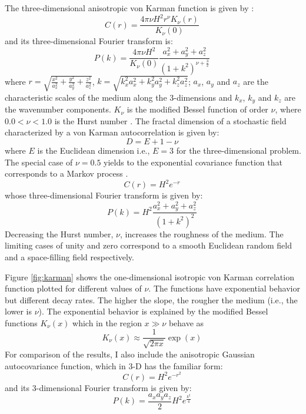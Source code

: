 The three-dimensional anisotropic von Karman function is given by \cite[]{Goff}:
\begin{equation}
C(r)=\frac{4\pi{\nu}H^2r^{\nu}K_{\nu}(r)}{K_{\nu}(0)} \
\label {eq7}
\end{equation}
and its three-dimensional Fourier transform is:
\begin{equation}
P(k)=\frac{4\pi{\nu}H^2}{K_{\nu}(0)}\frac{a_x^2+a_y^2+a_z^2}{{(1+k^2)}^{\nu+\frac {3} {2}}} \
\label {eq8}
\end{equation}
where $r=\sqrt{\frac{x^2}{a_x^2}+\frac{y^2}{a_y^2}+\frac{z^2}{a_z^2}}$,
 $k=\sqrt{k_x^2a_x^2+k_y^2a_y^2+k_z^2a_z^2}$;   
$a_x$, $a_y$ and $a_z$ are the characteristic scales of the medium along the 
3-dimensions and $k_x$, $k_y$ and $k_z$ are the wavenumber components. 
$K_\nu$ is the modified Bessel function of order $\nu$, 
where $0.0<\nu<1.0$ is the 
Hurst number \cite[]{Mandelbrot1,Mandelbrot2}. The fractal dimension of a stochastic
field characterized by a von Karman autocorrelation is given by:
\begin{equation}
D=E+1-\nu \
\label {eq0}
\end{equation}
where $E$ is the Euclidean dimension i.e., $E=3$ for the three-dimensional problem.
The special case of $\nu=0.5$ yields to the exponential covariance 
function that corresponds to a Markov process \cite[]{Feller}.
\begin{equation}
C(r)=H^2e^{-r} \
\label {eq9}
\end{equation}
whose three-dimensional Fourier transform is given by:
\begin{equation}
P(k)=H^2\frac{a_x^2+a_y^2+a_z^2}{{(1+k^2)}^{2}} \
\label {eq10}
\end{equation}
%
%
Decreasing the Hurst number, $\nu$, increases the roughness of the medium.
The limiting cases of unity and zero correspond to a smooth Euclidean random 
field and a space-filling field respectively.\\
%
\par
Figure \ref{fig:karman} shows the one-dimensional isotropic von Karman correlation 
function plotted
for different values of $\nu$. The functions have exponential behavior 
but different decay rates.
The higher the slope, the rougher the medium (i.e., the lower is $\nu$).
The exponential behavior is explained by the modified Bessel functions 
$K_\nu(x)$ which in the region $x \gg \nu$ behave as
\begin{equation}
K_\nu(x) \approx \frac {1} {\sqrt{2\pi x}} \exp{(x)} \
\label {eq11}
\end{equation}
%
For comparison of the results, I also include the anisotropic Gaussian 
autocovariance function, which in 3-D has the familiar form:
\begin{equation}
C(r)=H^2e^{-r^2} \
\label {eq5}
\end{equation}
and its 3-dimensional Fourier transform is given by:
\begin{equation}
P(k)=\frac{a_xa_ya_z}{2}H^2e^{\frac{k^2}{4}} \
\label {eq6}
\end{equation}

